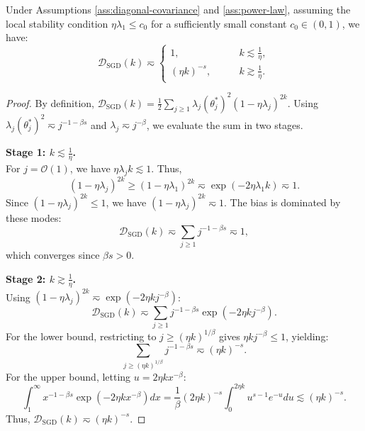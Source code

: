 \begin{proposition}
\label{prop:sgd_deterministic_bias}
Under Assumptions \ref{ass:diagonal-covariance} and \ref{ass:power-law}, assuming the local stability condition $\eta\lambda_1 \le c_0$ for a sufficiently small constant $c_0 \in (0, 1)$, we have:
\begin{equation*}
    \mathcal{D}_{\mathrm{SGD}}(k) \eqsim 
    \begin{cases}
    1, & \qquad k \lesssim \frac{1}{\eta}, \\
    (\eta k)^{-s}, & \qquad k \gtrsim \frac{1}{\eta}.
    \end{cases}
\end{equation*}
\end{proposition}
\begin{proof}
By definition, $\mathcal{D}_{\mathrm{SGD}}(k) = \frac{1}{2}\sum_{j\ge 1} \lambda_j (\theta_j^*)^2 (1-\eta\lambda_j)^{2k}$. Using $\lambda_j (\theta_j^*)^2 \eqsim j^{-1-\beta s}$ and $\lambda_j \eqsim j^{-\beta}$, we evaluate the sum in two stages.

\textbf{Stage 1: $k \lesssim \frac{1}{\eta}$.} \\
For $j = \mathcal{O}(1)$, we have $\eta\lambda_j k \lesssim 1$. Thus,
\[
    (1-\eta\lambda_j)^{2k} \ge (1-\eta\lambda_1)^{2k} \eqsim \exp(-2\eta\lambda_1 k) \eqsim 1.
\]
Since $(1-\eta\lambda_j)^{2k} \le 1$, we have $(1-\eta\lambda_j)^{2k} \eqsim 1$. The bias is dominated by these modes:
\[
    \mathcal{D}_{\mathrm{SGD}}(k) \eqsim \sum_{j\ge 1} j^{-1-\beta s} \eqsim 1,
\]
which converges since $\beta s > 0$.

\textbf{Stage 2: $k \gtrsim \frac{1}{\eta}$.} \\
Using $(1-\eta\lambda_j)^{2k} \eqsim \exp(-2\eta k j^{-\beta})$:
\[
    \mathcal{D}_{\mathrm{SGD}}(k) \eqsim \sum_{j\ge 1} j^{-1-\beta s} \exp(-2\eta k j^{-\beta}).
\]
For the lower bound, restricting to $j \ge (\eta k)^{1/\beta}$ gives $\eta k j^{-\beta} \le 1$, yielding:
\[
\sum_{j \ge (\eta k)^{1/\beta}} j^{-1-\beta s} \eqsim (\eta k)^{-s}.
\]
For the upper bound, letting $u = 2\eta k x^{-\beta}$:
\[
    \int_1^\infty x^{-1-\beta s} \exp(-2\eta k x^{-\beta}) dx = \frac{1}{\beta} (2\eta k)^{-s} \int_0^{2\eta k} u^{s-1} e^{-u} du \lesssim (\eta k)^{-s}.
\]
Thus, $\mathcal{D}_{\mathrm{SGD}}(k) \eqsim (\eta k)^{-s}$.
\end{proof}

